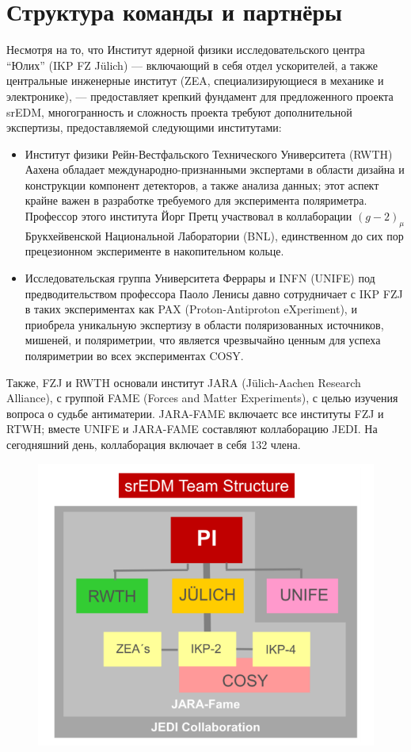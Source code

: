 \documentclass{extarticle}
\begin{document}
\section{Структура команды и партнёры}
Несмотря на то, что Институт ядерной физики исследовательского центра ``Юлих'' (IKP FZ J\"ulich) --- включающий в себя отдел ускорителей, а также центральные инженерные институт (ZEA, специализирующиеся в механике и электронике), --- предоставляет крепкий фундамент для предложенного проекта srEDM, многогранность и сложность проекта требуют  дополнительной экспертизы, предоставляемой следующими институтами:
\begin{itemize}
	\item Институт физики Рейн-Вестфальского Технического Университета (RWTH) Аахена обладает международно-признанными экспертами в области дизайна и конструкции компонент детекторов, а также анализа данных; этот аспект крайне важен в разработке требуемого для эксперимента поляриметра. Профессор этого института Йорг Претц участвовал в коллаборации $(g-2)_{\mu}$ Брукхейвенской Национальной Лаборатории (BNL), единственном до сих пор прецезионном эксперименте в накопительном кольце.
	\item Исследовательская группа Университета Феррары и INFN (UNIFE) под предводительством профессора Паоло Ленисы давно сотрудничает с IKP FZJ в таких экспериментах как PAX (Proton-Antiproton eXperiment), и приобрела уникальную экспертизу в области поляризованных источников, мишеней, и поляриметрии, что является чрезвычайно ценным для успеха поляриметрии во всех экспериментах COSY.
\end{itemize}

Также, FZJ и RWTH основали институт JARA (J\"ulich-Aachen Research Alliance), с группой FAME (Forces and Matter Experiments), с целью изучения вопроса о судьбе антиматерии. JARA-FAME включаетс все институты FZJ и RTWH; вместе UNIFE и JARA-FAME составляют коллаборацию JEDI. На сегодняшний день, коллаборация включает в себя 132 члена.

\begin{figure}[H]
	\centering\includegraphics[scale=.7]{img/JEDI_architecture}
\end{figure}
\end{document}
